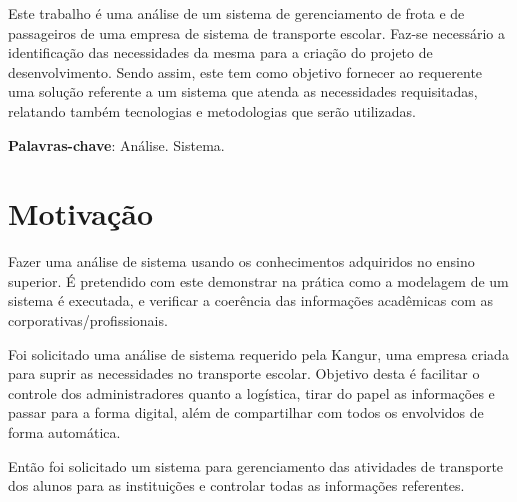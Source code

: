 \documentclass[
	12pt,				%
 	oneside,			%
 	openany,
	a4paper,			%
	english,			%
	french,				%
	spanish,			%
	brazil				%
	]{abntex2}
\begin{document}

\frenchspacing

\pretextual
\imprimircapa
\imprimirfolhaderosto*


\setlength{\absparsep}{18pt} %
\begin{resumo}
	Este trabalho é uma análise de um sistema de gerenciamento de frota e de 
	passageiros de uma empresa de sistema de transporte escolar. Faz-se 
	necessário a identificação das necessidades da mesma para a criação do
	projeto de desenvolvimento. Sendo assim, este tem como objetivo
	fornecer ao requerente uma solução referente a um sistema que atenda 
	as necessidades requisitadas, relatando também tecnologias e metodologias
	que serão utilizadas.

	\textbf{Palavras-chave}: Análise. Sistema.
\end{resumo}

\tableofcontents*
\cleardoublepage

\textual

\chapter{Motivação}

Fazer uma análise de sistema usando os conhecimentos adquiridos
no ensino superior. É pretendido com este demonstrar na prática como a modelagem de um sistema é executada, e verificar a coerência das informações acadêmicas com as corporativas/profissionais.

Foi solicitado uma análise de sistema requerido pela Kangur, uma empresa
criada para suprir as necessidades no transporte escolar. Objetivo 
desta é facilitar o controle dos administradores
quanto a logística, tirar do papel as informações e passar para a 
forma digital, além de compartilhar com todos os envolvidos de forma automática.

Então foi solicitado um sistema para gerenciamento das atividades 
de transporte dos alunos para as instituições e controlar todas 
as informações referentes.
\end{document}
